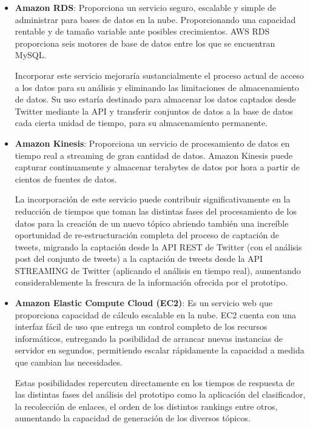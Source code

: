 	\begin{itemize}
		\item \textbf{Amazon RDS}: Proporciona un servicio seguro, escalable y simple de administrar para bases de datos en la nube. Proporcionando una capacidad rentable y de tamaño variable ante posibles crecimientos. AWS RDS proporciona seis motores de base de datos entre los que se encuentran MySQL.
		
		Incorporar este servicio mejoraría sustancialmente el proceso actual de acceso a los datos para su análisis y eliminando las limitaciones de almacenamiento de datos. Su uso estaría destinado para almacenar los datos captados desde Twitter mediante la API y transferir conjuntos de datos a la base de datos cada cierta unidad de tiempo, para su almacenamiento permanente.
		
		\item \textbf{Amazon Kinesis}: Proporciona un servicio de procesamiento de datos en tiempo real a streaming de gran cantidad de datos. Amazon Kinesis puede capturar continuamente y almacenar terabytes de datos por hora a partir de cientos de fuentes de datos.
		
		La incorporación de este servicio puede contribuir significativamente en la reducción de tiempos que toman las distintas fases del procesamiento de los datos para la creación de un nuevo tópico abriendo también una increíble oportunidad de  re-estructuración completa del proceso de captación de tweets, migrando  la captación desde la API REST de Twitter (con el análisis post del conjunto de tweets) a la captación de tweets desde la API STREAMING de Twitter (aplicando el análisis en tiempo real), aumentando considerablemente la frescura de la información ofrecida por el prototipo.
		
		\item \textbf{Amazon Elastic Compute Cloud (EC2)}: Es un servicio web que proporciona capacidad de cálculo escalable en la nube. EC2 cuenta con una interfaz fácil de uso que entrega un control completo de los recursos informáticos, entregando la posibilidad de arrancar nuevas instancias de servidor en segundos, permitiendo escalar rápidamente la capacidad a medida que cambian las necesidades.
		
		Estas posibilidades repercuten directamente en los tiempos de respuesta de las distintas fases del análisis del prototipo como la aplicación del clasificador, la recolección de enlaces, el orden de los distintos rankings entre otros, aumentando la capacidad de generación de los diversos tópicos.
		
	\end{itemize}
	
